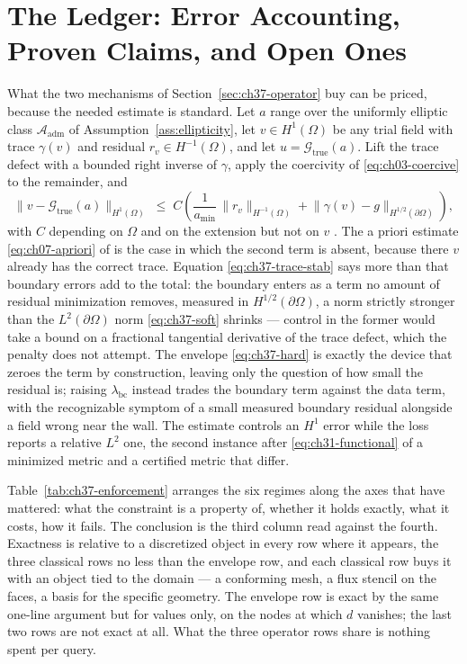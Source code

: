\section{The Ledger: Error Accounting, Proven Claims, and Open Ones}
\label{sec:ch37-ledger}

What the two mechanisms of Section~\ref{sec:ch37-operator} buy can be priced, because the
needed estimate is standard. Let $a$ range over the uniformly elliptic class
$\mathcal{A}_{\text{adm}}$ of Assumption~\ref{ass:ellipticity}, let $v\in H^1(\Omega)$ be any trial
field with trace $\gamma(v)$ and residual $r_v\in H^{-1}(\Omega)$, and let
$u=\mathcal{G}_{\text{true}}(a)$. Lift the trace defect with a bounded right inverse of $\gamma$,
apply the coercivity of \eqref{eq:ch03-coercive} to the remainder, and
\begin{equation}
  \label{eq:ch37-trace-stab}
  \big\|v-\mathcal{G}_{\text{true}}(a)\big\|_{H^{1}(\Omega)}
  \;\le\; C\left(\frac{1}{a_{\min}}\,\|r_v\|_{H^{-1}(\Omega)}
  + \big\|\gamma(v)-g\big\|_{H^{1/2}(\partial\Omega)}\right),
\end{equation}
with $C$ depending on $\Omega$ and on the extension but not on $v$
\cite{evans2010partial,quarteroni2008numerical}.
The a priori estimate \eqref{eq:ch07-apriori} of
 is the case in which the second term
is absent, because there $v$ already has the correct trace. Equation \eqref{eq:ch37-trace-stab} says
more
than that boundary errors add to the total: the boundary enters as a term no amount of residual
minimization removes, measured in $H^{1/2}(\partial\Omega)$, a norm strictly stronger than the
$L^2(\partial\Omega)$ norm \eqref{eq:ch37-soft} shrinks --- control in the former would take a
bound on a fractional tangential derivative of the trace defect, which the penalty does not attempt.
The envelope \eqref{eq:ch37-hard} is exactly the device that zeroes the term by construction,
leaving only the question of how small the residual is;
raising $\lambda_{\text{bc}}$ instead trades the boundary term against the data term, with the
recognizable symptom of a small measured boundary residual alongside a field wrong near the
wall. The estimate controls an $H^1$ error while the loss reports a relative $L^2$ one, the second
instance after \eqref{eq:ch31-functional} of a minimized metric and a certified metric that differ.

Table~\ref{tab:ch37-enforcement} arranges the six regimes along the axes that have mattered: what the
constraint is a property of, whether it holds exactly, what it costs, how it fails. The
conclusion is the third column read against the fourth. Exactness is relative to a discretized
object in every row where it appears, the three classical rows no less than the envelope row, and
each classical row buys it with an object tied to the domain --- a conforming mesh, a flux stencil
on the faces, a basis for the specific geometry. The envelope row is exact by the same one-line
argument but for values only, on the nodes at which $d$ vanishes; the last two rows are not exact
at all. What the three operator rows share is nothing spent per query.

